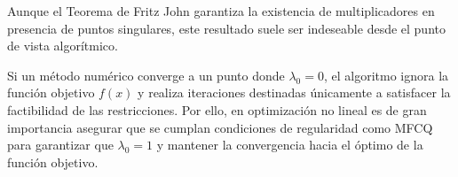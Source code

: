 \begin{warningbox}
 Aunque el Teorema de Fritz John garantiza la existencia de multiplicadores en presencia de puntos singulares, este resultado suele ser indeseable desde el punto de vista algorítmico.
 
 Si un método numérico converge a un punto donde $\lambda_0 = 0$, el algoritmo ignora la función objetivo $f(x)$ y realiza iteraciones destinadas únicamente a satisfacer la factibilidad de las restricciones. Por ello, en optimización no lineal es de gran importancia asegurar que se cumplan condiciones de regularidad como MFCQ para garantizar que $\lambda_0 = 1$ y mantener la convergencia hacia el óptimo de la función objetivo.
\end{warningbox}
